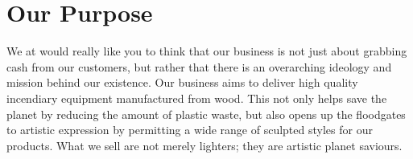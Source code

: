 \section{Our Purpose}
We at {\fw} would really like you to think that our business is not just about grabbing cash from our customers,
but rather that there is an overarching ideology and mission behind our existence.
Our business aims to deliver high quality incendiary equipment manufactured from wood.
This not only helps save the planet by reducing the amount of plastic waste, but also opens up the floodgates to artistic
expression by permitting a wide range of sculpted styles for our products.
What we sell are not merely lighters; they are artistic planet saviours.
